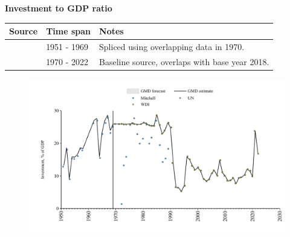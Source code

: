 \documentclass[12pt,a4paper,landscape]{article}
\begin{document}
\begin{adjustbox}{max totalsize={\paperwidth}{\paperheight},center}
\begin{minipage}[t][\textheight][t]{\textwidth}
\vspace*{0.5cm}
{}
\begin{center}
{\Large\bfseries Investment to GDP ratio}
\end{center}
\vspace{0.5cm}
\begin{table}[H]
\centering
\small
\begin{tabular}{|l|l|l|}
\hline
\textbf{Source} & \textbf{Time span} & \textbf{Notes} \\
\hline
\rowcolor{white}\cite{Mitchell}& 1951 - 1969 &Spliced using overlapping data in 1970. \\
\rowcolor{lightgray}\cite{WDI}& 1970 - 2022 &Baseline source, overlaps with base year 2018. \\
\hline
\end{tabular}
\end{table}
\begin{figure}[H]
\centering
\includegraphics[width=\textwidth,height=0.6\textheight,keepaspectratio]{graphs/CUB_inv_GDP.pdf}
\end{figure}
\end{minipage}
\end{adjustbox}
\end{document}
